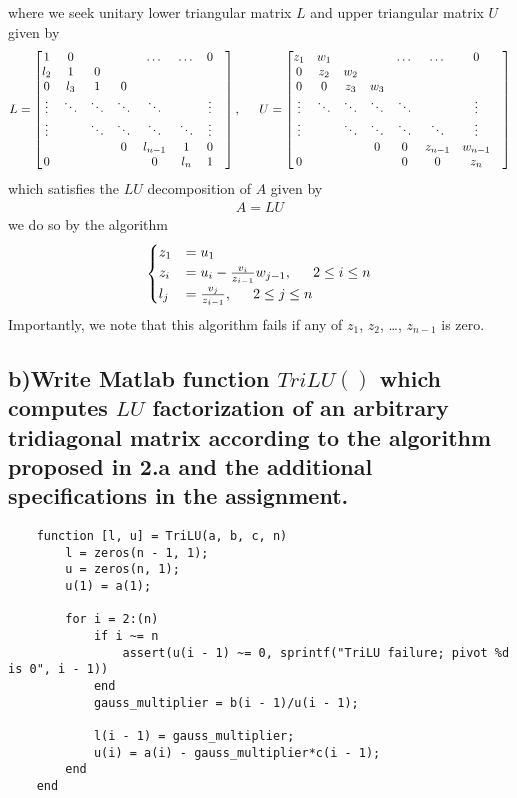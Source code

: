 \documentclass[11pt, letterpaper]{article}
\begin{document}
where we seek unitary lower triangular matrix $L$ and upper triangular matrix $U$ given by
\begin{align*}
    L=
    \begin{bmatrix}
        1 & 0 & & & \dots & \dots & 0\\
        l_2 & 1 & 0 & & & & &\\
        0 & l_3 & 1 & 0 & & & &\\
        \vdots & \ddots & \ddots & \ddots & \ddots & & \vdots\\
        \vdots & & \ddots & \ddots & \ddots & \ddots & \vdots\\
        & & & 0 & l_{n-1} & 1 & 0\\
        0 & & & & 0 & l_n & 1
    \end{bmatrix}
    ,\indent U=
    \begin{bmatrix}
        z_1 & w_1 & & & \dots & \dots & 0\\
        0 & z_2 & w_2 & & & & &\\
        0 & 0 & z_3 & w_3 & & & &\\
        \vdots & \ddots & \ddots & \ddots & \ddots & & \vdots\\
        \vdots & & \ddots & \ddots & \ddots & \ddots & \vdots\\
        & & & 0 & 0 & z_{n-1} & w_{n-1}\\
        0 & & & & 0 & 0 & z_n
    \end{bmatrix}
\end{align*}
which satisfies the $LU$ decomposition of $A$ given by
\begin{align*}
    A=LU
\end{align*}
we do so by the algorithm
\begin{align*}
    \begin{cases}
        z_1&=u_1\\
        z_i&=u_i-\frac{v_i}{z_{i-1}}w_{j-1},\indent 2\leq i\leq n\\
        l_j&=\frac{v_j}{z_{i-1}},\indent 2\leq j\leq n
    \end{cases}        
\end{align*}
Importantly, we note that this algorithm fails if any of $z_1$, $z_2$, \dots, $z_{n-1}$ is zero.
\subsection*{b)\normalfont Write Matlab function $TriLU()$ which computes $LU$ factorization of an arbitrary
tridiagonal matrix according to the algorithm proposed in 2.a and the additional specifications in the 
assignment.}
\begin{verbatim}
    function [l, u] = TriLU(a, b, c, n)
        l = zeros(n - 1, 1);
        u = zeros(n, 1);
        u(1) = a(1);
    
        for i = 2:(n)
            if i ~= n
                assert(u(i - 1) ~= 0, sprintf("TriLU failure; pivot %d is 0", i - 1))
            end
            gauss_multiplier = b(i - 1)/u(i - 1);
        
            l(i - 1) = gauss_multiplier;
            u(i) = a(i) - gauss_multiplier*c(i - 1);
        end
    end
\end{verbatim}
\end{document}
